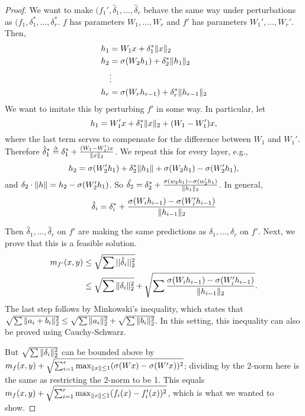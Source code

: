 \begin{proof}
We want to make $(f_1', \hat{\delta}_1, ..., \hat{\delta}_r$ behave the same way under perturbations as $(f_1, \delta_1^*, ..., \delta_r^*$. $f$ has parameters $W_1, ..., W_r$ and $f'$ has parameters $W_1', ..., W_r'$. Then,
\begin{align}
    h_1 &= W_1 x + \delta_1^* \|x\|_2 \\
    h_2 &= \sigma(W_2 h_1) + \delta_2^* \|h_1\|_2 \\
    &\vdots \\
    h_r &= \sigma(W_r h_{r - 1}) + \delta_r^* \|h_{r - 1}\|_2
\end{align}
We want to imitate this by perturbing $f'$ in some way. In particular, let
\begin{equation}
    h_1 = W_1'x + \delta_1^* \|x\|_2 + (W_1 - W_1')x,
\end{equation}
where the last term serves to compensate for the difference between $W_1$ and $W_1'$. Therefore $\hat{\delta}_1^* \defeq \delta_1^* + \frac{(W_1 - W_1')x}{\norm{x}_2}$.
We repeat this for every layer, e.g.,
\begin{equation}
    h_2 = \sigma(W_2' h_1) + \delta_2^*\|h_1\| + \sigma(W_2 h_1) - \sigma(W_2' h_1),
\end{equation}
and $\delta_2 \cdot \|h\| = h_2 - \sigma(W_2' h_1)$. So $\hat{\delta_2} = \delta_2^* + \frac{\sigma(w_2 h_1) - \sigma(w_2' h_1)}{\|h_1\|_2}$. In general, 
\begin{align}
    \hat{\delta}_i = \delta_i^* + \frac{\sigma(W_ih_{i-1}) - \sigma(W_i' h_{i-1})}{\|h_{i-1}\|_2}
\end{align} 

Then $\hat{\delta}_1, ..., \hat{\delta}_r$ on $f'$ are making the same predictions as $\delta_1, ..., \delta_r$ on $f'$. Next, we prove that this is a feasible solution.
\begin{align}
    m_{f'}(x, y) &\leq \sqrt{\sum ||\hat{\delta}_i||_2^2} \\
    &\leq \sqrt{\sum \|\delta_i\|_2^2} + \sqrt{\sum \frac{\sigma(W_i h_{i-1}) - \sigma(W_i' h_{i-1})}{\|h_{i-1}\|_2}}. 
\end{align} 
The last step follows by Minkowski's inequality, which states that $\sqrt{\sum \|a_i + b_i\|_2^2} \leq \sqrt{\sum \|a_i\|_2^2} + \sqrt{\sum \|b_i\|_2^2}$. In this setting, this inequality can also be proved using Cauchy-Schwarz.

But $\sqrt{\sum \|\delta_i\|_2^2}$ can be bounded above by $m_f(x, y) + \sqrt{\sum_{i=1}^r \max_{\|x\| \leq 1} (\sigma(Wx)-\sigma(W'x))^2}$; dividing by the 2-norm here is the same as restricting the 2-norm to be 1. This equals $m_f(x, y) + \sqrt{\sum_{i=1}^r \max_{\|x\| \leq 1} (f_i(x)-f_i'(x))^2}$, which is what we wanted to show.
\end{proof}

